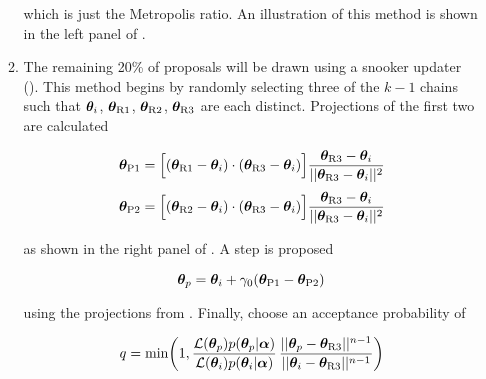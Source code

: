 \begin{enumerate}
\begin{enumerate}
\noindent which is just the Metropolis ratio.  An illustration of this method is shown in the left panel of
.

\item \label{itm:update_demc_snooker} The remaining 20\% of proposals will be drawn using a snooker updater
().  This method begins by randomly selecting three of the
$k - 1$ chains such that $\boldsymbol{\theta}_i$, $\boldsymbol{\theta}_{\mathrm{R1}}$,
$\boldsymbol{\theta}_{\mathrm{R2}}$, $\boldsymbol{\theta}_{\mathrm{R3}}$ are each distinct.  Projections of the first two are calculated

\begin{subequations}
\begin{align}
\boldsymbol{\theta}_{\mathrm{P1}} = \Big[ (\boldsymbol{\theta}_{\mathrm{R1}} - \boldsymbol{\theta}_i) \cdot
(\boldsymbol{\theta}_{\mathrm{R3}} - \boldsymbol{\theta}_i) \Big]
\frac{\boldsymbol{\theta}_{\mathrm{R3}} - \boldsymbol{\theta}_i}{||\boldsymbol{\theta}_{\mathrm{R3}} - \boldsymbol{\theta}_i||^2}
\label{eq:elifetime_fit_mcmc_de_snooker_proj1}
\\[3pt]
\boldsymbol{\theta}_{\mathrm{P2}} = \Big[ (\boldsymbol{\theta}_{\mathrm{R2}} - \boldsymbol{\theta}_i) \cdot
(\boldsymbol{\theta}_{\mathrm{R3}} - \boldsymbol{\theta}_i) \Big]
\frac{\boldsymbol{\theta}_{\mathrm{R3}} - \boldsymbol{\theta}_i}{||\boldsymbol{\theta}_{\mathrm{R3}} - \boldsymbol{\theta}_i||^2}
\label{eq:elifetime_fit_mcmc_de_snooker_proj2}
\end{align}
\label{eq:elifetime_fit_mcmc_de_snooker_projs}
\end{subequations}

\noindent as shown in the right panel of .  A step is proposed

\begin{equation}
\boldsymbol{\theta}_p = \boldsymbol{\theta}_i + \gamma_0 (\boldsymbol{\theta}_{\mathrm{P1}} - \boldsymbol{\theta}_{\mathrm{P2}})
\label{eq:elifetime_fit_mcmc_update_snooker}
\end{equation}

\noindent using the projections from .  Finally, choose an acceptance probability of

\begin{equation}
q = \mathrm{min} \bigg( 1, \frac{\mathcal{L}(\boldsymbol{\theta}_p) p(\boldsymbol{\theta}_p|\boldsymbol{\alpha})}
{\mathcal{L}(\boldsymbol{\theta}_i) p(\boldsymbol{\theta}_i|\boldsymbol{\alpha})}
\, \frac{||\boldsymbol{\theta}_p - \boldsymbol{\theta}_{\mathrm{R3}}||^{n - 1}} {||\boldsymbol{\theta}_i - \boldsymbol{\theta}_{\mathrm{R3}}||^{n - 1}} \bigg)
\label{eq:elifetime_fit_mcmc_demc_snook_acc_prob}
\end{equation}


\end{enumerate}
\end{enumerate}
